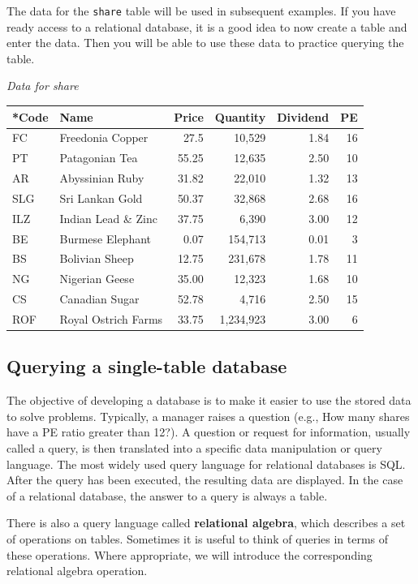 \documentclass[
]{article}
\begin{document}
The data for the \texttt{share} table will be used in subsequent
examples. If you have ready access to a relational database, it is a
good idea to now create a table and enter the data. Then you will be
able to use these data to practice querying the table.

\emph{Data for share}

\begin{longtable}[]{@{}llrrrr@{}}
\toprule()
*Code & Name & Price & Quantity & Dividend & PE \\
\midrule()
\endhead
FC & Freedonia Copper & 27.5 & 10,529 & 1.84 & 16 \\
PT & Patagonian Tea & 55.25 & 12,635 & 2.50 & 10 \\
AR & Abyssinian Ruby & 31.82 & 22,010 & 1.32 & 13 \\
SLG & Sri Lankan Gold & 50.37 & 32,868 & 2.68 & 16 \\
ILZ & Indian Lead \& Zinc & 37.75 & 6,390 & 3.00 & 12 \\
BE & Burmese Elephant & 0.07 & 154,713 & 0.01 & 3 \\
BS & Bolivian Sheep & 12.75 & 231,678 & 1.78 & 11 \\
NG & Nigerian Geese & 35.00 & 12,323 & 1.68 & 10 \\
CS & Canadian Sugar & 52.78 & 4,716 & 2.50 & 15 \\
ROF & Royal Ostrich Farms & 33.75 & 1,234,923 & 3.00 & 6 \\
\bottomrule()
\end{longtable}

\hypertarget{querying-a-single-table-database}{%
\subsection{Querying a single-table
database}\label{querying-a-single-table-database}}

The objective of developing a database is to make it easier to use the
stored data to solve problems. Typically, a manager raises a question
(e.g., How many shares have a PE ratio greater than 12?). A question or
request for information, usually called a query, is then translated into
a specific data manipulation or query language. The most widely used
query language for relational databases is SQL. After the query has been
executed, the resulting data are displayed. In the case of a relational
database, the answer to a query is always a table.

There is also a query language called \textbf{relational algebra}, which
describes a set of operations on tables. Sometimes it is useful to think
of queries in terms of these operations. Where appropriate, we will
introduce the corresponding relational algebra operation.
\end{document}
